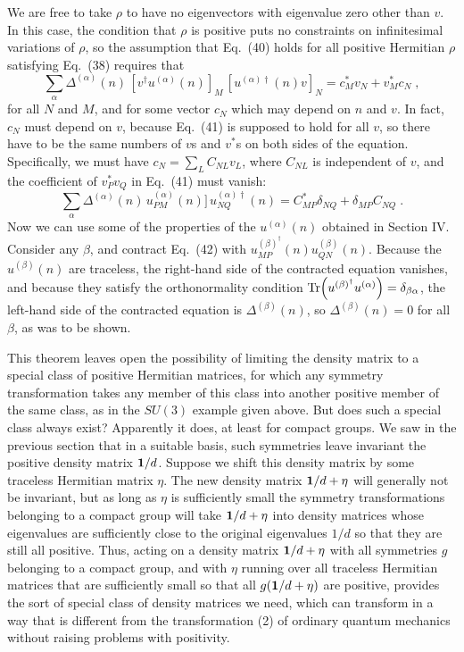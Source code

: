 \documentclass[12pt]{article}
\def\BM#1{\mbox{\boldmath{$#1$}}}
\begin{document}
We are free to take $\rho$ to have no eigenvectors with eigenvalue zero other than $v$. In this case, the condition that $\rho$ is positive puts no constraints on infinitesimal variations of $\rho$, so the assumption that Eq.~(40) holds for all positive Hermitian $\rho$ satisfying Eq.~(38) requires that 
\begin{equation}
\sum_\alpha  \Delta^{(\alpha)}(n)\, [v^\dagger u^{(\alpha)}(n)]_M\, [u^{(\alpha)\dagger}(n)v]_N =c_M^*v_N+v_M^*c_N\;,
\end{equation}
for all $N$ and $M$, and for some vector $c_N$ which may depend on $n$ and $v$.  In fact, $c_N$ must depend on $v$, because Eq.~(41) is supposed to hold for all $v$, so there have to be the same numbers of $v$s and $v^*$s on both sides of the equation.  Specifically, we must have $c_N=\sum_L C_{NL}v_L$, where $C_{NL}$ is independent of $v$, and the coefficient of $v_P^*v_Q$ in Eq.~(41) must vanish:
\begin{equation}
\sum_\alpha  \Delta^{(\alpha)}(n)\,  u_{PM}^{(\alpha)}(n)]\, u_{NQ}^{(\alpha)\dagger}(n) =C_{MP}^*\delta_{NQ}+\delta_{MP}C_{NQ}\;.
\end{equation}
Now we can use some of the properties of the $u^{(\alpha)}(n)$ obtained in Section IV.  Consider any $\beta$,  and contract Eq.~(42) with $u^{(\beta)^\dagger}_{MP}(n)u^{(\beta)}_{QN}(n)$.  Because the $u^{(\beta)}(n)$ are traceless, the right-hand side of the contracted equation   vanishes, and because they satisfy the orthonormality condition ${\rm Tr}\Big(u^{(\beta)^\dagger}u^{(\alpha)}\Big)=\delta_{\beta\alpha}$, the left-hand side of the  contracted equation is $\Delta^{(\beta)}(n)$, so $\Delta^{(\beta)}(n)=0$ for all $\beta$, as was to be shown.

This theorem leaves open the possibility of limiting the density matrix to a special class of positive Hermitian matrices, for which  any symmetry transformation takes any member of this class into another positive member of the same class, as in the $SU(3)$ example given above.  But does such a special class always exist?  Apparently it does, at least for compact groups.  We saw in the previous section that in a suitable basis, such symmetries leave invariant the positive density matrix ${\BM 1}/d$.  Suppose we shift this density matrix by some traceless Hermitian matrix $\eta$.  The new density matrix  ${\BM 1}/d+\eta$ will generally not  be invariant, but  as long as $\eta$ is sufficiently small the symmetry transformations  belonging to a compact group will take ${\BM 1}/d+\eta$ into  density matrices whose eigenvalues are sufficiently close to the original eigenvalues $1/d$ so that they are still all positive.  Thus,  acting  on a density matrix  ${\BM 1}/d+\eta$ with all symmetries $g$ belonging to a compact group, and with $\eta$  running over all traceless Hermitian matrices that are   sufficiently small so that all $g({\BM 1}/d+\eta)$  are positive, provides the sort of special class of density matrices we need, which can transform in a way that is different from the transformation (2) of   ordinary quantum mechanics without raising problems with positivity.
\end{document}
